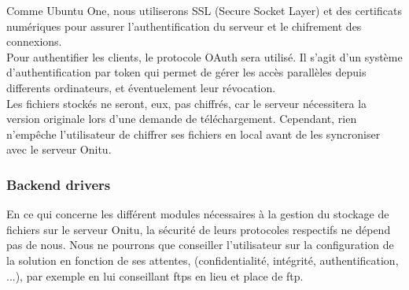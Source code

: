 Comme Ubuntu One, nous utiliserons SSL (Secure Socket Layer) et des certificats numériques pour assurer l'authentification du serveur et le chifrement des connexions.\\

Pour authentifier les clients, le protocole OAuth sera utilisé. Il s'agit d'un système d'authentification par token qui permet de gérer les accès parallèles depuis differents ordinateurs, et éventuelement leur révocation.\\

Les fichiers stockés ne seront, eux, pas chiffrés, car le serveur nécessitera la version originale lors d'une demande de téléchargement. Cependant, rien n'empêche l'utilisateur de chiffrer ses fichiers en local avant de les syncroniser avec le serveur Onitu.

\subsubsection{Backend drivers}
En ce qui concerne les différent modules nécessaires à la gestion du stockage de fichiers sur le serveur Onitu, la sécurité de leurs protocoles respectifs ne dépend pas de nous. Nous ne pourrons que conseiller l'utilisateur sur la configuration de la solution en fonction de ses attentes, (confidentialité, intégrité, authentification, ...), par exemple en lui conseillant ftps en lieu et place de ftp.
